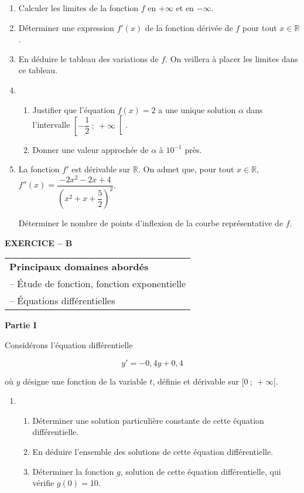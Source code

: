 \documentclass[11pt]{article}
\newcommand{\R}{\mathbb{R}}
\begin{document}
\begin{enumerate}
\item Calculer les limites de la fonction $f$ en $+\infty$ et en $-\infty$.
\item Déterminer une expression $f'(x)$ de la fonction dérivée de $f$ pour tout $x \in \R$.
\item En déduire le tableau des variations de $f$. On veillera à placer les limites dans ce tableau.
\item 
	\begin{enumerate}
		\item Justifier que l'équation $f(x) = 2$ a une unique solution $\alpha$ dans l'intervalle $\left[-\dfrac{1}{2}~;~+ \infty\right[$. 
		\item Donner une valeur approchée de $\alpha$ à $10^{-1}$ près.
 	\end{enumerate}
\item La fonction $f'$ est dérivable sur $\R$. On admet que, pour tout $x \in  \R$,\,  $f''(x) = \dfrac{-2x^2 - 2x + 4}{\left(x^2 + x + \dfrac{5}{2}\right)^2}$.

Déterminer le nombre de points d'inflexion de la courbe représentative de $f$.
\end{enumerate}

\bigskip

\textbf{EXERCICE -- B}

\medskip

\begin{tabular}{|l|}\hline
\textbf{Principaux domaines abordés}\\
-- Étude de fonction, fonction exponentielle\\
-- Équations différentielles\\ \hline
\end{tabular}

\bigskip

\textbf{Partie I}

\medskip

Considérons l'équation différentielle

\[y'= -0,4y + 0,4\]

où $y$ désigne une fonction de la variable $t$, définie et dérivable sur $[0~;~ + \infty[$.

\medskip

\begin{enumerate}
\item 
	\begin{enumerate}
		\item Déterminer une solution particulière constante de cette équation différentielle. 
		\item En déduire l'ensemble des solutions de cette équation différentielle.
\item Déterminer la fonction $g$, solution de cette équation différentielle, qui vérifie $g(0) = 10$.
	\end{enumerate}
\end{enumerate}
\end{document}
